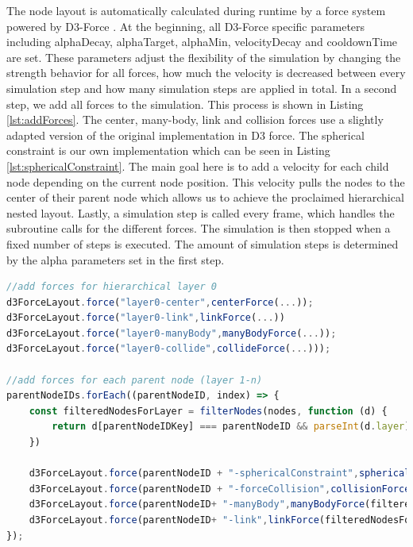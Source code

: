 The node layout is automatically calculated during runtime by a force system powered by D3-Force \cite{bostock_d3forcejs_nodate}. At the beginning, all D3-Force specific parameters including alphaDecay, alphaTarget, alphaMin, velocityDecay and cooldownTime are set. 
These parameters adjust the flexibility of the simulation by changing the strength behavior for all forces, how much the velocity is decreased between every simulation step and how many simulation steps are applied in total.
In a second step, we add all forces to the simulation. This process is shown in Listing \ref{lst:addForces}.
The center, many-body, link and collision forces use a slightly adapted version of the original implementation in D3 force. 
The spherical constraint is our own implementation which can be seen in Listing \ref{lst:sphericalConstraint}. The main goal here is to add a velocity for each child node depending on the current node position. This velocity pulls the nodes to the center of their parent node which allows us to achieve the proclaimed hierarchical nested layout.
Lastly, a simulation step is called every frame, which handles the subroutine calls for the different forces. The simulation is then stopped when a fixed number of steps is executed. The amount of simulation steps is determined by the alpha parameters set in the first step.

\begin{lstlisting}[language=JavaScript,label={lst:addForces},caption=Simplified algorithm that shows which forces are added to the simulation.] 
//add forces for hierarchical layer 0
d3ForceLayout.force("layer0-center",centerForce(...));
d3ForceLayout.force("layer0-link",linkForce(...))
d3ForceLayout.force("layer0-manyBody",manyBodyForce(...));
d3ForceLayout.force("layer0-collide",collideForce(...)));

//add forces for each parent node (layer 1-n)
parentNodeIDs.forEach((parentNodeID, index) => {
    const filteredNodesForLayer = filterNodes(nodes, function (d) {
        return d[parentNodeIDKey] === parentNodeID && parseInt(d.layer) === childLayer;
    })

    d3ForceLayout.force(parentNodeID + "-sphericalConstraint",sphericalConstraint(filteredNodesForLayer,...));
    d3ForceLayout.force(parentNodeID + "-forceCollision",collisionForce(filteredNodesForLayer,...));
    d3ForceLayout.force(parentNodeID+ "-manyBody",manyBodyForce(filteredNodesForLayer,...));
    d3ForceLayout.force(parentNodeID+ "-link",linkForce(filteredNodesForLayer,...));
});
\end{lstlisting}
\pagebreak


